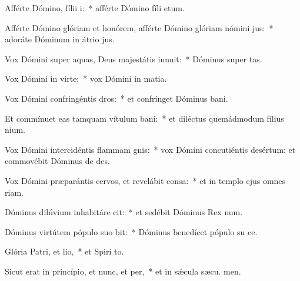 \item Afférte Dómino, fílii i:~* afférte Dómino fíli etum.
\item Afférte Dómino glóriam et honórem, afférte Dómino glóriam nómini jus:~* adoráte Dóminum in átrio  jus.
\item Vox Dómini super aquas, Deus majestátis innuit:~* Dóminus super  tas.
\item Vox Dómini in virte:~* vox Dómini in matia.
\item Vox Dómini confringéntis dros:~* et confrínget Dóminus  bani.
\item Et commínuet eas tamquam vítulum bani:~* et diléctus quemádmodum fílius nium.
\item Vox Dómini intercidéntis flammam gnis:~* vox Dómini concutiéntis desértum: et commovébit Dóminus de des.
\item Vox Dómini præparántis cervos, et revelábit consa:~* et in templo ejus omnes  riam.
\item Dóminus dilúvium inhabitáre cit:~* et sedébit Dóminus Rex  num.
\item Dóminus virtútem pópulo suo bit:~* Dóminus benedícet pópulo su  ce.
\item Glória Patri, et lio,~* et Spirí to.
\item Sicut erat in princípio, et nunc, et per,~* et in sǽcula sæcu. men.
